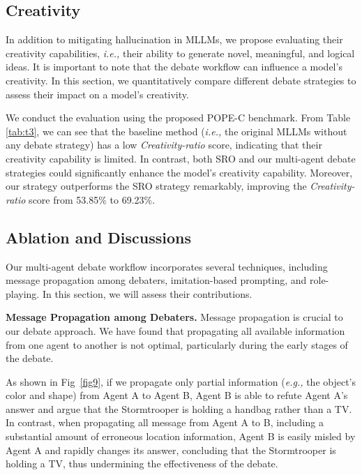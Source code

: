 \documentclass[10pt,twocolumn,letterpaper]{article}
\begin{document}
\subsection{Creativity}
In addition to mitigating hallucination in MLLMs, we propose evaluating their creativity capabilities, \emph{i.e.,} their ability to generate novel, meaningful, and logical ideas. It is important to note that the debate workflow can influence a model's creativity. In this section, we quantitatively compare different debate strategies to assess their impact on a model's creativity.

We conduct the evaluation using the proposed POPE-C benchmark. From Table \ref{tab:t3}, we can see that the baseline method (\emph{i.e.,} the original MLLMs without any debate strategy) has a low \emph{Creativity-ratio} score, indicating that their creativity capability is limited. 
In contrast, both SRO and our multi-agent debate strategies could significantly enhance the model's creativity capability. Moreover, our strategy outperforms the SRO strategy remarkably, improving the \emph{Creativity-ratio} score from 53.85\% to 69.23\%.

\subsection{Ablation and Discussions}
Our multi-agent debate workflow incorporates several techniques, including message propagation among debaters, imitation-based prompting, and role-playing. In this section, we will assess their contributions.

\noindent\textbf{Message Propagation among Debaters.}
Message propagation is crucial to our debate approach. We have found that propagating all available information from one agent to another is not optimal, particularly during the early stages of the debate.

As shown in Fig~\ref{fig9}, if we propagate only partial information (\emph{e.g.,} the object's color and shape) from Agent A to Agent B, Agent B is able to refute Agent A's answer and argue that the Stormtrooper is holding a handbag rather than a TV. In contrast, when propagating all message from Agent A to B, including a substantial amount of erroneous location information, Agent B is easily misled by Agent A and rapidly changes its answer, concluding that the Stormtrooper is holding a TV, thus undermining the effectiveness of the debate.
\end{document}
